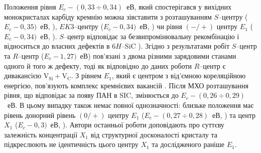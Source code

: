 \documentclass[a4paper,14pt,oneside,openany]{memoir}
\begin{document}
Положення рівня $E_c-(0,33\div0,34)$~еВ, який спостерігався у вихідних монокристалах карбіду кремнію
можна зівставити з розташуванням $S$--центру ($E_c-0,35)$~еВ, \cite{Lebed1999,Anikin1991:2,Anikin1991:3}),
$EK3$--центру ($E_c-0,34)$~еВ, \cite{Kuznets1997}) чи рівня $(-/+)$ центру $E_1$ ($E_c-0,34)$~еВ, \cite{Lebed1999}).
$S$--центр відповідає за безвипромінювальну рекомбінацію і відноситься до власних дефектів в 6$H$--SiC \cite{Lebed1999}).
Згідно з результатами робіт \cite{Anikin1991:2,Anikin1991:3} $S$--центр та $R$--центр ($E_c-1,27)$~еВ) пов'язані
з двома різними зарядовими станами одного й того ж дефекту, тоді як відповідно до даних роботи \cite{Lebedev2000}
$R$--центр є дивакансією V$_\text{Si}+$V$_\text{C}$.
З рівнем $E_1$, який є центром з від'ємною кореляційною енергією,
пов'язують комплекс кремнієвих вакансій  \cite{Lebedev2001}.
Після МХО розташування рівня, що відповідає за появу ПАН в SIC, змінюється до $E_c-(0,26\div0,29)$~еВ.
В цьому випадку також немає повної однозначності:
близьке положення має рівень донорний рівень $(0/+)$ центру $E_1$ ($E_c-(0,27\div0,28)$~еВ, \cite{Hemmingsson})
та центр $X_1$ ($E_c-0,3)$~еВ, \cite{Lebedev2001}).
Автори останньої роботи доповідають про суттєву залежність концентрації $X_1$ від структурної
досконалості кристалу та підкреслюють не ідентичність цього центру  $X_1$  та  дослідженого раніше $E_1$.
\end{document}
